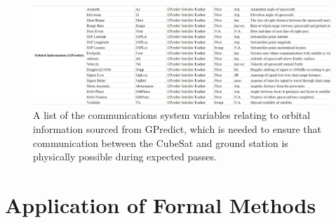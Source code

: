 \documentclass[conf]{new-aiaa}
\begin{document}
\begin{figure}[!ht]
\centering
\includegraphics[width=.8\textwidth]{Fig/GPredictVAR.png}
\caption{A list of the communications system variables relating to orbital information sourced from GPredict, which is needed to ensure that communication between the CubeSat and ground station is physically possible during expected passes.}
\label{Variables}
\end{figure}


\section{Application of Formal Methods}
\end{document}
